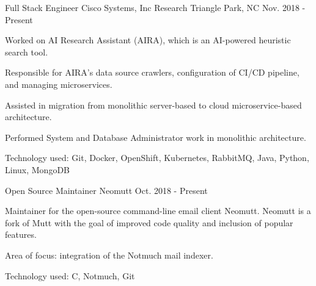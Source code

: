 

\begin{cventries}
  \cventry
    {Full Stack Engineer} %
    {Cisco Systems, Inc} %
    {Research Triangle Park, NC} %
    {Nov. 2018 - Present} %
    {
      \begin{cvitems}
      \item {
          Worked on AI Research Assistant (AIRA), which is an AI-powered
          heuristic search tool.
        }
      \item {
          Responsible for AIRA's data source crawlers, configuration of CI/CD
          pipeline, and managing microservices.
        }
      \item {
          Assisted in migration from monolithic server-based to cloud
          microservice-based architecture.
        }
      \item {
          Performed System and Database Administrator work in monolithic
          architecture.
        }
      \item {
          Technology used: Git, Docker, OpenShift, Kubernetes, RabbitMQ, Java,
          Python, Linux, MongoDB
        }
      \end{cvitems}
    }
  \cventry
    {Open Source Maintainer} %
    {Neomutt} %
    {} %
    {Oct. 2018 - Present} %
    {
      \begin{cvitems}
      \item {
          Maintainer for the open-source command-line email client Neomutt. Neomutt
          is a fork of Mutt with the goal of improved code quality and inclusion of
          popular features.
        }
      \item {
          Area of focus: integration of the Notmuch mail indexer.
        }
      \item {
          Technology used: C, Notmuch, Git
        }
      \end{cvitems}
    }

\end{cventries}
